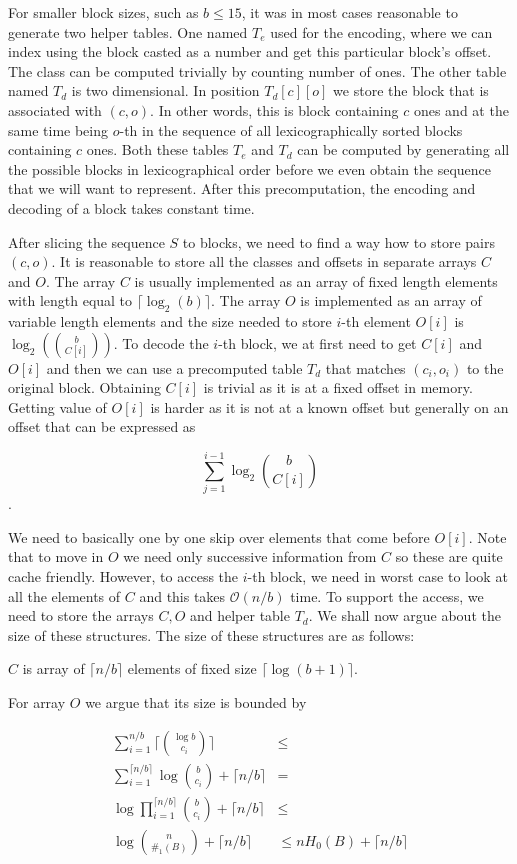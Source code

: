 For smaller block sizes, such as $b\leq 15$, it was in most cases reasonable to
generate two helper tables. One named $T_e$ used for the encoding, where we can
index using the block casted as a number and get this particular block's offset.
The class can be computed trivially by counting number of ones. The other table
named $T_d$ is two dimensional. In position $T_d[c][o]$ we store the block that
is associated with $(c, o)$. In other words, this is block containing $c$ ones
and at the same time being $o$-th in the sequence of all lexicographically sorted
blocks containing $c$ ones. Both these tables $T_e$ and $T_d$ can be computed
by generating all the possible blocks in lexicographical order before we even
obtain the sequence that we will want to represent. After this precomputation,
the encoding and decoding of a block takes constant time.

After slicing the sequence $S$ to blocks, we need to find a way how to store
pairs $(c, o)$. It is reasonable to store all the classes and offsets in separate
arrays $C$ and $O$. The array $C$ is usually implemented as an array of fixed length
elements with length equal to $\lceil \log_2(b)\rceil$. The array $O$ is implemented as an
array of variable length elements and the size needed to store $i$-th element $O[i]$ is
$\log_2({b\choose C[i]})$. To decode the $i$-th block, we at first need to get
$C[i]$ and $O[i]$ and then we can use a precomputed table $T_d$ that matches $(c_i, o_i)$
to the original block. Obtaining $C[i]$ is trivial as it is at a fixed offset in
memory. Getting value of $O[i]$ is harder as it is not at a known offset but generally
on an offset that can be expressed as

                $$\sum_{j=1}^{i-1} \log_2{b\choose C[i]}$$.

We need to basically one by one skip over elements that come before $O[i]$.
Note that to move in $O$ we need only successive information from $C$ so these
are quite cache friendly. However, to access the $i$-th block, we need in worst
case to look at all the elements of $C$ and this takes $\mathcal{O}(n/b)$ time. To support
the access, we need to store the arrays $C, O$ and helper table $T_d$. We shall
now argue about the size of these structures. The size of these structures are
as follows:

$C$ is array of $\lceil n/b \rceil$ elements of fixed size $\lceil \log(b+1) \rceil$.

For array $O$ we argue that its size is bounded by

\begin{align}
    \sum_{i=1}^{n/b} \bigg\lceil{\log b\choose c_i}\bigg\rceil &\leq \\ 
    \sum_{i=1}^{\lceil n/b \rceil} \log {b\choose c_i} + \lceil n/b \rceil &= \\ 
    \log\prod_{i=1}^{\lceil n/b \rceil} {b\choose c_i} + \lceil n/b \rceil &\leq \\
    \log{n\choose \#_1(B)} +  \lceil n/b \rceil &\leq nH_0(B) +  \lceil n/b \rceil
\end{align}

